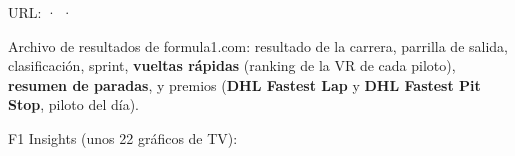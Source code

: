 URL: \href{https://www.formula1.com/en/results/awards}{} · \href{https://aws.amazon.com/sports/f1/}{} · \href{https://corp.formula1.com/new-f1-insights-powered-by-aws-will-help-formula-1-fans-make-sense-of-split-second-decisions-on-the-track/}{}

Archivo de resultados de formula1.com: resultado de la carrera, parrilla de salida, clasificación, sprint, \textbf{vueltas rápidas} (ranking de la VR de cada piloto), \textbf{resumen de paradas}, y premios (\textbf{DHL Fastest Lap} y \textbf{DHL Fastest Pit Stop}, piloto del día).

F1 Insights (unos 22 gráficos de TV):

